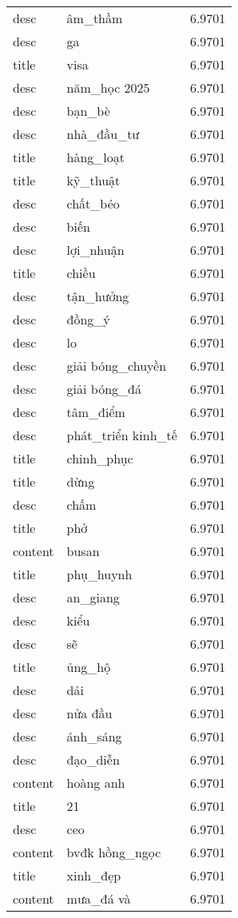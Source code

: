 \documentclass{article}
\begin{document}
\begin{tabular}{lll}
desc & âm\_thầm & 6.9701\\
desc & ga & 6.9701\\
title & visa & 6.9701\\
desc & năm\_học 2025 & 6.9701\\
desc & bạn\_bè & 6.9701\\
desc & nhà\_đầu\_tư & 6.9701\\
title & hàng\_loạt & 6.9701\\
title & kỹ\_thuật & 6.9701\\
desc & chất\_béo & 6.9701\\
desc & biến & 6.9701\\
desc & lợi\_nhuận & 6.9701\\
title & chiều & 6.9701\\
desc & tận\_hưởng & 6.9701\\
desc & đồng\_ý & 6.9701\\
desc & lo & 6.9701\\
desc & giải bóng\_chuyền & 6.9701\\
desc & giải bóng\_đá & 6.9701\\
desc & tâm\_điểm & 6.9701\\
desc & phát\_triển kinh\_tế & 6.9701\\
title & chinh\_phục & 6.9701\\
title & dừng & 6.9701\\
desc & chấm & 6.9701\\
title & phở & 6.9701\\
content & busan & 6.9701\\
title & phụ\_huynh & 6.9701\\
desc & an\_giang & 6.9701\\
desc & kiểu & 6.9701\\
desc & sẽ & 6.9701\\
title & ủng\_hộ & 6.9701\\
desc & dải & 6.9701\\
desc & nửa đầu & 6.9701\\
desc & ánh\_sáng & 6.9701\\
desc & đạo\_diễn & 6.9701\\
content & hoàng anh & 6.9701\\
title & 21 & 6.9701\\
desc & ceo & 6.9701\\
content & bvđk hồng\_ngọc & 6.9701\\
title & xinh\_đẹp & 6.9701\\
content & mưa\_đá và & 6.9701\\

\end{tabular}
\end{document}
